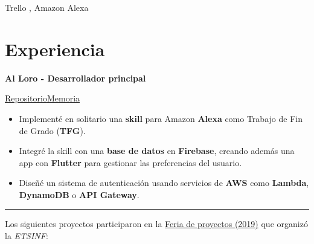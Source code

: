 \documentclass[letterpaper, 12pt]{article}
\begin{document}
    Trello \faTrello, Amazon Alexa \faAmazon

    \pagebreak

    \section{Experiencia}

    \begin{center}    
    \textbf{Al Loro - Desarrollador principal}\par
    \vspace{.2em}
    \href{https://github.com/algono/FeedTheParrot-RSS}{Repositorio}\hspace{1em}\href{http://hdl.handle.net/10251/174256}{Memoria}
    \end{center}
    \begin{itemize}
        \item Implementé en solitario una \textbf{skill} para Amazon \textbf{Alexa} como Trabajo de Fin de Grado (\textbf{TFG}).
        \item Integré la skill con una \textbf{base de datos} en \textbf{Firebase}, creando además una app con \textbf{Flutter} para gestionar las preferencias del usuario.
        \item Diseñé un sistema de autenticación usando servicios de \textbf{AWS} como \textbf{Lambda}, \textbf{DynamoDB} o \textbf{API Gateway}.
    \end{itemize}
    \rule{\textwidth}{.4pt}
    
    \vspace{5pt}
    Los siguientes proyectos participaron en la \href{https://es-es.facebook.com/etsinf/videos/feria-de-proyectos-de-estudiantes-2019/1921312964681641/}{Feria de proyectos (2019)} que organizó la \emph{ETSINF}:

    \vspace{2em}
\end{document}
